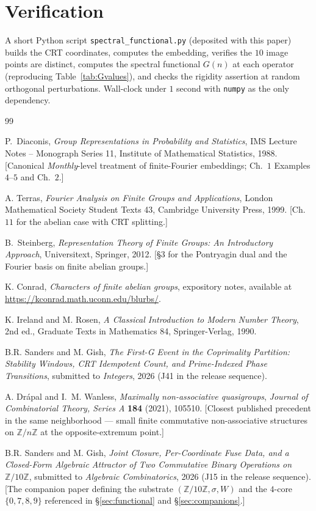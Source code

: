\documentclass[11pt,reqno]{amsart}
\theoremstyle{definition}
\newcommand{\Z}{\mathbb{Z}}
\begin{document}
\section*{Verification}

A short Python script \texttt{spectral\_functional.py} (deposited
with this paper) builds the CRT coordinates, computes the
embedding, verifies the $10$ image points are distinct, computes
the spectral functional $G(n)$ at each operator (reproducing
Table~\ref{tab:Gvalues}), and checks the rigidity assertion at
random orthogonal perturbations. Wall-clock under $1$ second with
\texttt{numpy} as the only dependency.

\begin{thebibliography}{99}

P.~Diaconis, \emph{Group Representations in Probability and
Statistics}, IMS Lecture Notes -- Monograph Series 11, Institute
of Mathematical Statistics, 1988. [Canonical
\emph{Monthly}-level treatment of finite-Fourier embeddings;
Ch.~$1$ Examples $4$--$5$ and Ch.~$2$.]

A. Terras, \emph{Fourier Analysis on Finite Groups and
Applications}, London Mathematical Society Student Texts 43,
Cambridge University Press, 1999. [Ch.~$11$ for the abelian case
with CRT splitting.]

B.~Steinberg, \emph{Representation Theory of Finite Groups: An
Introductory Approach}, Universitext, Springer, 2012. [\S$3$ for
the Pontryagin dual and the Fourier basis on finite abelian
groups.]

K. Conrad, \emph{Characters of finite abelian groups}, expository
notes, available at \url{https://kconrad.math.uconn.edu/blurbs/}.

K. Ireland and M. Rosen, \emph{A Classical Introduction to Modern
Number Theory}, 2nd ed., Graduate Texts in Mathematics 84,
Springer-Verlag, 1990.

B.R. Sanders and M. Gish, \emph{The First-G Event in the
Coprimality Partition: Stability Windows, CRT Idempotent Count,
and Prime-Indexed Phase Transitions}, submitted to
\emph{Integers}, 2026 (J41 in the release sequence).

A. Drápal and I.~M. Wanless, \emph{Maximally non-associative
quasigroups}, \emph{Journal of Combinatorial Theory, Series A}
\textbf{184} (2021), 105510. [Closest published precedent in the
same neighborhood --- small finite commutative non-associative
structures on $\Z/n\Z$ at the opposite-extremum point.]

B.R. Sanders and M. Gish, \emph{Joint Closure, Per-Coordinate
Fuse Data, and a Closed-Form Algebraic Attractor of Two
Commutative Binary Operations on $\Z/10\Z$}, submitted to
\emph{Algebraic Combinatorics}, 2026 (J15 in the release
sequence). [The companion paper defining the substrate
$(\Z/10\Z, \sigma, W)$ and the $4$-core $\{0, 7, 8, 9\}$
referenced in \S\ref{sec:functional} and \S\ref{sec:companions}.]

\end{thebibliography}
\end{document}
